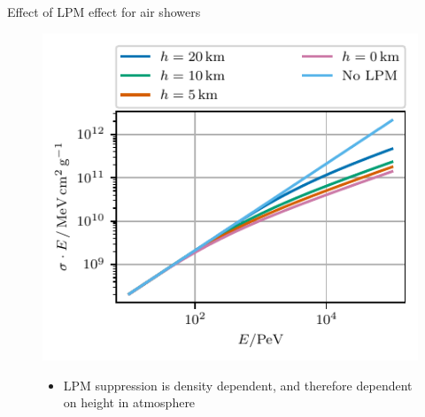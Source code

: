 \documentclass[t]{beamer}
\begin{document}
\begin{columns}[onlytextwidth]
\begin{column}{0.45\textwidth}
\begin{block}[equal height group=PLOTS]{Effect of LPM effect for air showers}
\begin{figure}
\begin{minipage}[t]{0.49\textwidth}
\begin{itemize}
                \end{itemize}
              \end{minipage}%
              \hfill
              \begin{minipage}[t]{0.49\textwidth}
                \includegraphics[width=\linewidth, keepaspectratio]{../plots/lpm_cross_photopair_small.pdf}
                  \vspace{-1.5cm}
                  \begin{itemize}
                      \item LPM suppression is density dependent, and therefore dependent on height in atmosphere
                  \end{itemize}
              \end{minipage}
              \end{figure}
      \end{block}
    \end{column}
    \end{columns}
\end{document}
